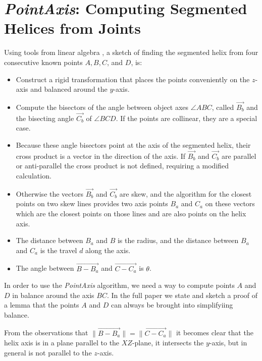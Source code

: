 \documentclass{svproc}
\begin{document}
\section{{\em PointAxis}: Computing Segmented Helices from Joints}
\label{sec:pointaxis}

Using tools from linear algebra \cite{kahn1989defining}, a sketch of finding the segmented helix from
four consecutive known points $A,B,C$, and $D$, is:
\begin{itemize}
\item Construct a rigid transformation that places the points conveniently on the $z$-axis and balanced
  around the $y$-axis.
\item Compute the bisectors of the angle between object axes $ \angle{ABC}$, called $\overrightarrow{B_b}$ and the
  bisecting angle $\overrightarrow{C_b}$ of $\angle{BCD}$.
  If the points are collinear, they are a special case.
\item Because these angle bisectors point at the axis of the segmented helix, their cross product is a vector
  in the direction of the axis. If $\overrightarrow{B_b}$ and $\overrightarrow{C_b}$ are parallel or anti-parallel the cross product is not defined, requiring a modified calculation.
\item  Otherwise the vectors $\overrightarrow{B_b}$ and $\overrightarrow{C_b}$ are skew, and the algorithm for the closest points on
  two skew lines provides two axis points $B_a$ and $C_a$ on these vectors which
  are the closest points on those lines and are also points on the helix axis.
\item The distance between $B_a$ and $B$ is the radius, and the distance between $B_a$ and $C_a$ is the travel $d$ along the axis.
  \item The angle between $\overrightarrow{B - B_a}$ and $\overrightarrow{C - C_a}$ is $\theta$.
\end{itemize}

In order to use the {\em PointAxis} algorithm, we need a way
to compute points $A$ and $D$ in balance around the axis $BC$. In the full paper\cite{readfullsegmentedhelix}
we state and sketch a proof of a lemma that the points $A$ and $D$ can always be brought into simplifyiing balance.

From the observations that $\| \overrightarrow{B - B_a} \| = \| \overrightarrow{C - C_a} \|$
it becomes clear that the helix axis is in a plane
parallel to the $XZ$-plane, it intersects the $y$-axis, but in general is
not parallel to the $z$-axis.
\end{document}
